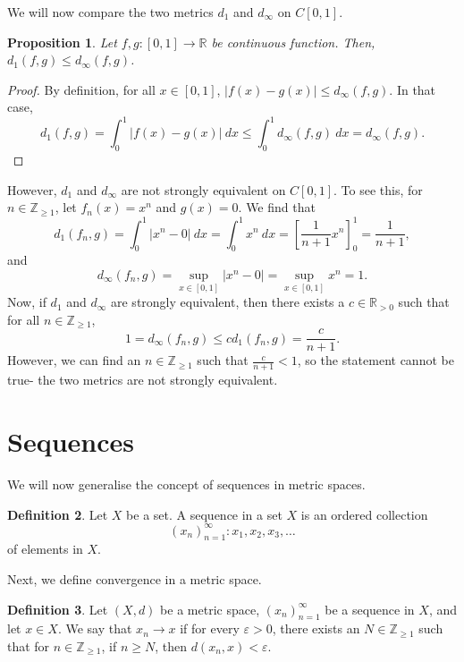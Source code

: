 \documentclass[a4paper, openany]{memoir}
\theoremstyle{definition}
\newtheorem{definition}{Definition}[section]
\theoremstyle{plain}
\newtheorem{proposition}[definition]{Proposition}
\begin{document}
We will now compare the two metrics $d_1$ and $d_\infty$ on $C[0, 1]$.
\begin{proposition}
Let $f, g: [0, 1] \to \mathbb{R}$ be continuous function. Then, $d_1(f, g) \leqslant d_\infty(f, g)$.
\end{proposition}
\begin{proof}
By definition, for all $x \in [0, 1]$, $|f(x) - g(x)| \leqslant d_\infty(f, g)$. In that case,
\[d_1(f, g) = \int_0^1 |f(x) - g(x)| \ dx \leqslant \int_0^1 d_\infty(f, g) \ dx = d_\infty(f, g).\]
\end{proof}
\noindent However, $d_1$ and $d_\infty$ are not strongly equivalent on $C[0, 1]$. To see this, for $n \in \mathbb{Z}_{\geqslant 1}$, let $f_n(x) = x^n$ and $g(x) = 0$. We find that
\[d_1(f_n, g) = \int_0^1 |x^n - 0| \ dx = \int_0^1 x^n \ dx = \left[\frac{1}{n+1} x^n\right]_0^1 = \frac{1}{n+1},\]
and
\[d_\infty(f_n, g) = \sup_{x \in [0, 1]} |x^n - 0| = \sup_{x \in [0, 1]} x^n = 1.\]
Now, if $d_1$ and $d_\infty$ are strongly equivalent, then there exists a $c \in \mathbb{R}_{> 0}$ such that for all $n \in \mathbb{Z}_{\geqslant 1}$,
\[1 = d_\infty(f_n, g) \leqslant c d_1(f_n, g) = \frac{c}{n+1}.\]
However, we can find an $n \in \mathbb{Z}_{\geqslant 1}$ such that $\frac{c}{n+1} < 1$, so the statement cannot be true- the two metrics are not strongly equivalent.
\newpage

\section{Sequences}
We will now generalise the concept of sequences in metric spaces. 
\begin{definition}
Let $X$ be a set. A sequence in a set $X$ is an ordered collection 
\[(x_n)_{n=1}^{\infty} : x_1, x_2, x_3, \dots\]
of elements in $X$.
\end{definition}
\noindent Next, we define convergence in a metric space.
\begin{definition}
Let $(X, d)$ be a metric space,  $(x_n)_{n=1}^{\infty}$ be a sequence in $X$, and let $x \in X$. We say that $x_n \to x$ if for every $\varepsilon > 0$, there exists an $N \in \mathbb{Z}_{\geqslant 1}$ such that for $n \in \mathbb{Z}_{\geqslant 1}$, if $n \geqslant N$, then $d(x_n, x) < \varepsilon$. 
\end{definition}
\end{document}
